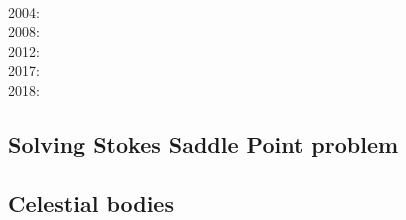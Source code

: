\begin{scriptsize}
\cite{faha}\\
2004: \cite{rugy04}\\
2008: \cite{chzy08}\cite{stmt08}\cite{bikh08}\\
2012: \cite{may12}\\
2017: \cite{krke17}\\
2018: \cite{cram18}
\end{scriptsize}

\subsection{Solving Stokes Saddle Point problem}

\begin{scriptsize}
\cite{laqu86}
\cite{rotf90}
\cite{frha93}
\cite{elgo94}
\cite{cheb96}\cite{elma96}
\cite{brpv97}
\cite{lixu01}
\cite{dogs06}\cite{lica06}
\cite{hoow17}
\end{scriptsize}

\subsection{Celestial bodies}

